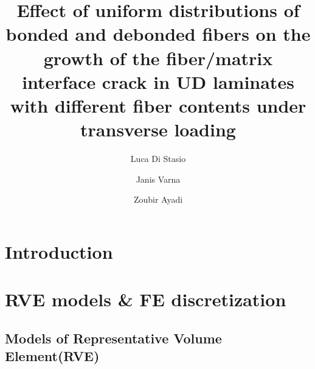 \documentclass[review]{elsarticle}
\begin{document}
\begin{frontmatter}

\title{Effect of uniform distributions of bonded and debonded fibers on the growth of the fiber/matrix interface crack in UD laminates with different fiber contents under transverse loading}


\author[nancy,lulea]{Luca Di Stasio}
\author[lulea]{Janis Varna}
\author[nancy]{Zoubir Ayadi}


\address[nancy]{Universit\'e de Lorraine, EEIGM, IJL, 6 Rue Bastien Lepage, F-54010 Nancy, France}
\address[lulea]{Lule\aa\ University of Technology, University Campus, SE-97187 Lule\aa, Sweden}

\begin{abstract}

\end{abstract}


\end{frontmatter}

\linenumbers

\section{Introduction}

\section{RVE models \& FE discretization}

\subsection{Models of Representative Volume Element(RVE)}
\end{document}

